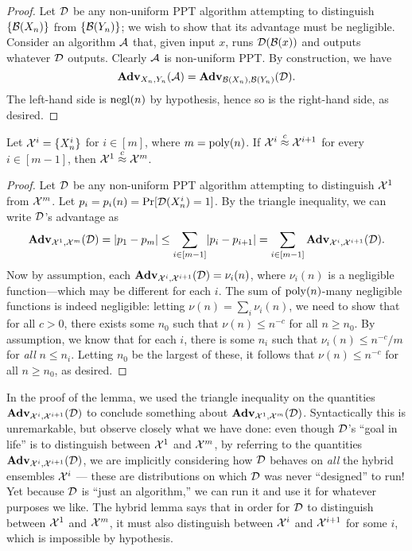 \documentclass[11pt]{article}
\begin{document}
\begin{proof}
  Let $\mathcal{D}$ be any non-uniform PPT algorithm attempting to
  distinguish $\{\mathcal{B}(X_{n})\}$ from $\{\mathcal{B}(Y_{n})\}$; we wish
  to show that its advantage must be negligible.  Consider an
  algorithm $\mathcal{A}$ that, given input $x$, runs $\mathcal{D}(\mathcal{B}(x))$ and
  outputs whatever $\mathcal{D}$ outputs.  Clearly $\mathcal{A}$ is non-uniform
  PPT.  By construction, we have
  \[ \mathbf{Adv}_{X_{n},Y_{n}}(\mathcal{A}) =
    \mathbf{Adv}_{\mathcal{B}(X_{n}),\mathcal{B}(Y_{n})}(\mathcal{D}).
  \] The left-hand side is $\operatorname{negl}(n)$ by hypothesis, hence so is the
  right-hand side, as desired.
\end{proof}

\begin{lemma}
  \label{lem:hybrid}
  Let $\mathcal{X}^{i} = \{X^{i}_{n}\}$ for $i \in [m]$, where
  $m=\operatorname{poly}(n)$.  If $\mathcal{X}^{i} \stackrel{c}{\approx} \mathcal{X}^{i+1}$ for every
  $i \in [m-1]$, then $\mathcal{X}^{1} \stackrel{c}{\approx} \mathcal{X}^{m}$.
\end{lemma}

\begin{proof}
  Let $\mathcal{D}$ be any non-uniform PPT algorithm attempting to
  distinguish $\mathcal{X}^{1}$ from $\mathcal{X}^{m}$.  Let
  $p_{i} = p_{i}(n) = \Pr[\mathcal{D}(X^{i}_{n}) = 1]$.  By the triangle
  inequality, we can write $\mathcal{D}$'s advantage as
  \[ \mathbf{Adv}_{\mathcal{X}^{1},\mathcal{X}^{m}}(\mathcal{D}) = \lvert p_{1} - p_{m}\rvert \leq
    \sum_{i \in [m-1]} \lvert p_{i} - p_{i+1}\rvert = \sum_{i \in [m-1]}
    \mathbf{Adv}_{\mathcal{X}^{i}, \mathcal{X}^{i+1}}(\mathcal{D}). \] Now by assumption, each
  $\mathbf{Adv}_{\mathcal{X}^{i}, \mathcal{X}^{i+1}}(\mathcal{D}) = \nu_{i}(n)$, where
  $\nu_{i}(n)$ is a negligible function---which may be different for
  each $i$.  The sum of $\operatorname{poly}(n)$-many negligible functions is indeed
  negligible: letting $\nu(n) = \sum_{i} \nu_{i}(n)$, we need to show
  that for all $c > 0$, there exists some $n_{0}$ such that
  $\nu(n) \leq n^{-c}$ for all $n \geq n_{0}$.  By assumption, we know
  that for each $i$, there is some $n_{i}$ such that
  $\nu_{i}(n) \leq n^{-c}/m$ for \emph{all} $n \leq n_{i}$.  Letting
  $n_{0}$ be the largest of these, it follows that
  $\nu(n) \leq n^{-c}$ for all $n \geq n_{0}$, as desired.
\end{proof}

\begin{remark}
  In the proof of the lemma, we used the triangle inequality on the
  quantities $\mathbf{Adv}_{\mathcal{X}^{i},\mathcal{X}^{i+1}}(\mathcal{D})$ to conclude
  something about $\mathbf{Adv}_{\mathcal{X}^{1}, \mathcal{X}^{m}}(\mathcal{D})$.
  Syntactically this is unremarkable, but observe closely what we have
  done: even though $\mathcal{D}$'s ``goal in life'' is to distinguish
  between $\mathcal{X}^{1}$ and $\mathcal{X}^{m}$, by referring to the quantities
  $\mathbf{Adv}_{\mathcal{X}^{i},\mathcal{X}^{i+1}}(\mathcal{D})$, we are implicitly
  considering how $\mathcal{D}$ behaves on \emph{all} the hybrid ensembles
  $\mathcal{X}^{i}$ --- these are distributions on which $\mathcal{D}$ was never
  ``designed'' to run!  Yet because $\mathcal{D}$ is ``just an algorithm,''
  we can run it and use it for whatever purposes we like.  The hybrid
  lemma says that in order for $\mathcal{D}$ to distinguish between
  $\mathcal{X}^{1}$ and $\mathcal{X}^{m}$, it must also distinguish between
  $\mathcal{X}^{i}$ and $\mathcal{X}^{i+1}$ for some $i$, which is impossible by
  hypothesis.
\end{remark}
\end{document}
